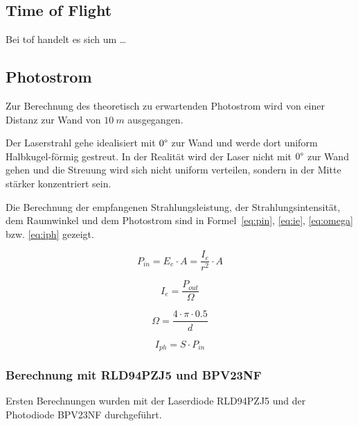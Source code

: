 \subsection{Time of Flight}

Bei \acrshort{tof} handelt es sich um \dots

\pagebreak

\subsection{Photostrom}

Zur Berechnung des theoretisch zu erwartenden Photostrom wird von einer Distanz zur Wand von $10~m$ ausgegangen.

Der Laserstrahl gehe idealisiert mit $0\degree$ zur Wand und werde dort uniform Halbkugel-förmig gestreut. In der
Realität wird der Laser nicht mit $0\degree$ zur Wand gehen und die Streuung wird sich nicht uniform verteilen, sondern
in der Mitte stärker konzentriert sein.

Die Berechnung der empfangenen Strahlungsleistung, der Strahlungsintensität, dem Raumwinkel und dem Photostrom sind in
Formel~\ref{eq:pin}, \ref{eq:ie}, \ref{eq:omega} bzw. \ref{eq:iph} gezeigt.

\begin{equation}\label{eq:pin}
    P_{in} = E_e \cdot A = \frac{I_e}{r^2} \cdot A
\end{equation}

\begin{equation}\label{eq:ie}
    I_e = \frac{P_{out}}{\Omega}
\end{equation}

\begin{equation}\label{eq:omega}
    \Omega = \frac{4\cdot \pi \cdot 0.5}{d}
\end{equation}

\begin{equation}\label{eq:iph}
    I_{ph} = S \cdot P_{in}
\end{equation}

\subsubsection{Berechnung mit RLD94PZJ5 und BPV23NF}

Ersten Berechnungen wurden mit der Laserdiode RLD94PZJ5 \cite{rohm2020rld94pzj5_datasheet} und der Photodiode BPV23NF
\cite{vishay2024bpv23nf_datasheet} durchgeführt.

